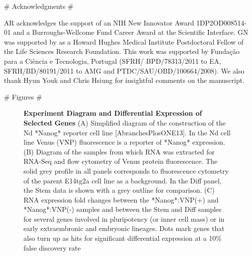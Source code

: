 \documentclass[aps,prl,twocolumn,superscriptaddress]{revtex4}
\begin{document}
# Acknowledgments #

\begin{acknowledgments}
AR acknowledges the support of an NIH New Innovator Award 1DP2OD008514-01 and a Burroughs-Wellcome Fund Career Award at the Scientific Interface.
GN was supported by as a Howard Hughes Medical Institute Postdoctoral Fellow of the Life Sciences Research Foundation. This work was supported by Funda\c{c}\~ao para a Ci\^encia e Tecnologia, Portugal  (SFRH/ BPD/78313/2011 to EA, SFRH/BD/80191/2011 to AMG and PTDC/SAU/OBD/100664/2008). We also thank Hyun Youk and Chris Hsiung for insightful comments on the manuscript.
\end{acknowledgments}




# Figures #

\pagebreak

\begin{figure}[H]

\caption{\label{FIG:overview} \textbf{Experiment Diagram and Differential Expression of Selected Genes} (A) Simplified diagram of the construction of the Nd *Nanog* reporter cell line [AbranchesPlosONE13]. In the Nd cell line Venus (VNP) fluorescence is a reporter of *Nanog* expression. (B) Diagram of the samples from which RNA was extracted for RNA-Seq and flow cytometry of Venus protein fluorescence.  The solid grey profile in all panels corresponds to fluorescence cytometry of the parent E14tg2a cell line as a background. In the Diff panel, the Stem data is shown with a grey outline for comparison.  (C) RNA expression fold changes between the *Nanog*:VNP(+) and *Nanog*:VNP(-) samples and between the Stem and Diff samples for several genes involved in pluripotency (or inner cell mass) or in early extraembronic and embryonic lineages. Dots mark genes that also turn up as hits for significant differential expression at a 10\% false discovery rate}
\end{figure}
\end{document}
